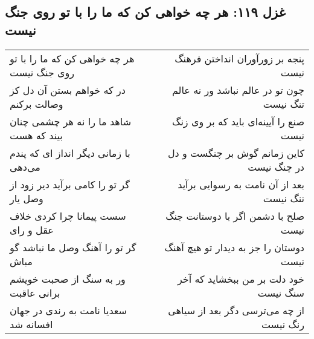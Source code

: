 \begin{center}
\section*{غزل ۱۱۹: هر چه خواهی کن که ما را با تو روی جنگ نیست}
\label{sec:119}
\begin{longtable}{l p{0.5cm} r}
هر چه خواهی کن که ما را با تو روی جنگ نیست
&&
پنجه بر زورآوران انداختن فرهنگ نیست
\\
در که خواهم بستن آن دل کز وصالت برکنم
&&
چون تو در عالم نباشد ور نه عالم تنگ نیست
\\
شاهد ما را نه هر چشمی چنان بیند که هست
&&
صنع را آیینه‌ای باید که بر وی زنگ نیست
\\
با زمانی دیگر انداز ای که پندم می‌دهی
&&
کاین زمانم گوش بر چنگست و دل در چنگ نیست
\\
گر تو را کامی برآید دیر زود از وصل یار
&&
بعد از آن نامت به رسوایی برآید ننگ نیست
\\
سست پیمانا چرا کردی خلاف عقل و رای
&&
صلح با دشمن اگر با دوستانت جنگ نیست
\\
گر تو را آهنگ وصل ما نباشد گو مباش
&&
دوستان را جز به دیدار تو هیچ آهنگ نیست
\\
ور به سنگ از صحبت خویشم برانی عاقبت
&&
خود دلت بر من ببخشاید که آخر سنگ نیست
\\
سعدیا نامت به رندی در جهان افسانه شد
&&
از چه می‌ترسی دگر بعد از سیاهی رنگ نیست
\\
\end{longtable}
\end{center}
